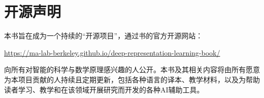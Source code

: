 \documentclass[../../book-main.tex]{subfiles}
\begin{document}
\chapter*{开源声明}


本书旨在成为一个持续的“开源项目”，通过书的官方开源网站：
\begin{center}
    \url{https://ma-lab-berkeley.github.io/deep-representation-learning-book/}
\end{center}
向所有对智能的科学与数学原理感兴趣的人公开。本书及其相关内容将由所有愿意为本项目贡献的人持续且定期更新，包括各种语言的译本、教学材料，以及为帮助读者学习、教学和在该领域开展研究而开发的各种AI辅助工具。
\end{document}
